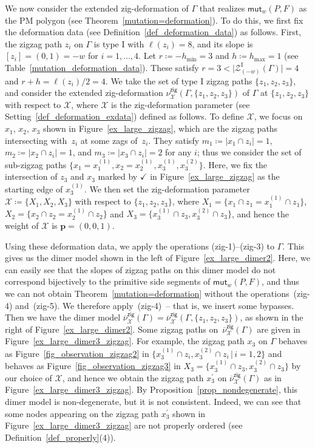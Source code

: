 \documentclass[pdftex]{sigma}%
\numberwithin{equation}{section}
\numberwithin{figure}{section}
\numberwithin{table}{section}
\newcommand{\rmI}{\mathrm{I}}
\newcommand{\calX}{\mathcal{X}}
\newcommand{\calZ}{\mathcal{Z}}
\newcommand{\bfp}{\mathbf{p}}
\newcommand{\zig}{\mathsf{zig}}
\newcommand{\mut}{\mathsf{mut}}
\begin{document}
\begin{Example}
We now consider the extended zig-deformation of $\Gamma$ that realizes $\mut_w(P,F)$ as the PM polygon (see Theorem~\ref{mutation=deformation}).
To do this, we first fix the deformation data (see Definition~\ref{def_deformation_data}) as follows.
First, the zigzag path $z_i$ on $\Gamma$ is type I with $\ell(z_i)=8$, and its slope is $[z_i]=(0,1)=-w$ for $i=1,\dots,4$.
Let $r\coloneqq -h_{\min}=3$ and $h\coloneqq h_{\max}=1$ (see Table~\ref{mutation_deformation_data}).
These satisfy $r=3<\big|\calZ^\rmI_{(-w)}(\Gamma)\big|=4$ and $r+h=\ell(z_i)/2=4$.
We take the set of type I zigzag paths $\{z_1,z_2,z_3\}$, and consider the extended zig-deformation $\nu^\zig_\calX(\Gamma,\{z_1,z_2,z_3\})$ of $\Gamma$ at $\{z_1,z_2,z_3\}$ with respect to $\calX$,
where $\calX$ is the zig-deformation parameter (see Setting~\ref{def_deformation_exdata}) defined as follows.
To define $\calX$, we focus on $x_1$, $x_2$, $x_3$ shown in Figure~\ref{ex_large_zigzag}, which are the zigzag paths intersecting with~$z_i$ at some zags of~$z_i$.
They satisfy $m_1\coloneqq|x_1\cap z_i|=1$, $m_2\coloneqq|x_2\cap z_i|=1$, and $m_3\coloneqq|x_3\cap z_i|=2$ for any $i$;
thus we consider the set of sub-zigzag paths $\big\{x_1=x_1^{(1)}, x_2=x_2^{(1)}, x_3^{(1)}, x_3^{(2)}\big\}$.
Here, we fix the intersection of $z_3$ and $x_3$ marked by $\checkmark$ in Figure~\ref{ex_large_zigzag} as the starting edge of $x_3^{(1)}$.
We then set the zig-deformation parameter $\calX\coloneqq\{X_1,X_2,X_3\}$ with respect to $\{z_1,z_2,z_3\}$,
where $X_1=\big\{x_1\cap z_1=x_1^{(1)}\cap z_1\big\}$, $X_2=\big\{x_2\cap z_2=x_2^{(1)}\cap z_2\big\}$ and $X_3=\big\{x_3^{(1)}\cap z_3, x_3^{(2)}\cap z_3\big\}$,
and hence the weight of $\calX$ is $\bfp=(0,0,1)$.

Using these deformation data, we apply the operations (zig-1)--(zig-3) to $\Gamma$.
This gives us the dimer model shown in the left of Figure~\ref{ex_large_dimer2}.
Here, we can easily see that the slopes of zigzag paths on this dimer model do not correspond bijectively to the primitive side segments of
$\mut_w(P,F)$, and thus we can not obtain Theorem~\ref{mutation=deformation} without the operations~(zig-4) and~\mbox{(zig-5)}. We therefore apply~(zig-4)~-- that is, we insert some bypasses.
Then we have the dimer model $\overline{\nu}^\zig_\calX(\Gamma)=\overline{\nu}^\zig_\calX(\Gamma, \{z_1,z_2,z_3\})$, as shown in the right of Figure~\ref{ex_large_dimer2}.
Some zigzag paths on~$\overline{\nu}^\zig_\calX(\Gamma)$ are given in Figure~\ref{ex_large_dimer3_zigzag}.
For example, the zigzag path $x_3$ on $\Gamma$ behaves as Figure~\ref{fig_observation_zigzag2} in
$\big\{x_3^{(1)}\cap z_i,\allowbreak x_3^{(2)}\cap z_i \,|\, i=1,2\big\}$ and behaves as Figure~\ref{fig_observation_zigzag3} in $X_3=\big\{x_3^{(1)}\cap z_3, x_3^{(2)}\cap z_3\big\}$
by our choice of $\calX$, and hence we obtain the zigzag path $x_3^\prime$ on $\overline{\nu}^\zig_\calX(\Gamma)$ as in Figure~\ref{ex_large_dimer3_zigzag}.
By Proposition~\ref{prop_nondegenerate}, this dimer model is non-degenerate, but it is not consistent.
Indeed, we can see that some nodes appearing on the zigzag path $x^\prime_3$ shown in Figure~\ref{ex_large_dimer3_zigzag} are not properly ordered (see Definition~\ref{def_properly}(4)).


\end{Example}
\end{document}
